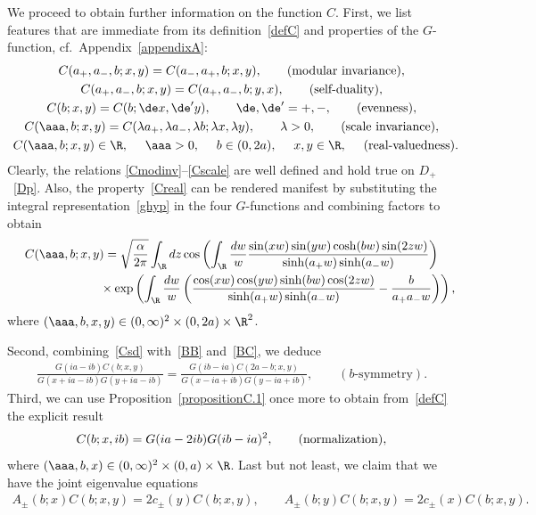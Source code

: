 \documentclass[pdftex]{sigma}
\numberwithin{equation}{section}
\begin{document}
We proceed to obtain further information on the function $C$. First, we list features that are immediate from its def\/inition~\eqref{defC} and properties of the $G$-function, cf.~Appendix~\ref{appendixA}:
\begin{gather}\label{Cmodinv}
C(a_{+},a_{-},b;x,y)=C(a_{-},a_{+},b;x,y),\qquad  ({\rm modular\  invariance}),
\\
\label{Csd}
C(a_{+},a_{-},b;x,y)=C(a_{+},a_{-},b;y,x),\qquad  (\mbox{self-duality}),
\\
\label{Ceven}
C(b;x,y)=C(b;\de x, \de'y),\qquad \de,\de'=+,-,\qquad ({\rm evenness}),
\\
\label{Cscale}
C(\aaa,b;x,y)=C(\lambda  a_{+},\lambda a_{-}, \lambda b;\lambda x,\lambda y),\qquad \lambda>0,\qquad ({\rm scale\ invariance}),
\\
\label{Creal}
C(\aaa,b;x,y)\in\R,\!\!\!\!\qquad  \aaa>0,\!\!\!\!\qquad b\in(0,2a),\!\!\!\!\qquad x,y\in\R,\!\!\!\!\qquad \mbox{(real-valuedness)}.\!\!\!\!
\end{gather}
Clearly, the relations \eqref{Cmodinv}--\eqref{Cscale} are well def\/ined and hold true on $D_+$~\eqref{Dp}.  Also, the property~\eqref{Creal} can be rendered manifest by substituting the integral representation~\eqref{ghyp} in the four $G$-functions and combining factors to obtain
\begin{gather}
C(\aaa,b;x,y)=  \sqrt{\frac{\alpha}{2\pi}}  \int_{\R}dz\cos\left( \int_{\R}\frac{dw}{w}\frac{\sin(xw)\sin(yw)\cosh(bw)\sin(2zw)}{\sinh(a_{+}w)\sinh(a_-w)}\right)  \\
\phantom{C(\aaa,b;x,y)=}{}  \times \exp\left( \int_{\R}\frac{dw}{w}\left(\frac{\cos(xw)\cos(yw)\sinh(bw)\cos(2zw)}{\sinh(a_{+}w)\sinh(a_-w)}-\frac{b}{a_+a_-w}\right)\right),  \nonumber
\end{gather}
  where $(\aaa,b,x,y)\in(0,\infty)^2\times(0,2a)\times\R^2$.

Second, combining~\eqref{Csd} with~\eqref{BB} and~\eqref{BC}, we deduce
\begin{gather}\label{Cbsym}
\frac{G(ia-ib)C(b;x,y)}{G(x+ia-ib)G(y+ia-ib)}=
\frac{G(ib-ia)C(2a-b;x,y)}{G(x-ia+ib)G(y-ia+ib)},\qquad (b\mbox{-symmetry}).
\end{gather}
Third, we can use Proposition~\ref{propositionC.1} once more to obtain from~\eqref{defC} the explicit result
\begin{gather}\label{Cnorm}
C(b;x,ib)=G(ia-2ib)G(ib-ia)^2,\qquad ({\rm normalization}),
\end{gather}
where $(\aaa,b,x)\in(0,\infty)^2\times (0,a)\times \R$.
Last but not least, we claim that we have the joint eigenvalue equations
\begin{gather}\label{Cades}
A_{\pm}(b;x)C(b;x,y)=2c_{\pm}(y)C(b;x,y),\qquad A_{\pm}(b;y)C(b;x,y)=2c_{\pm}( x)C(b;x,y).
\end{gather}
\end{document}
